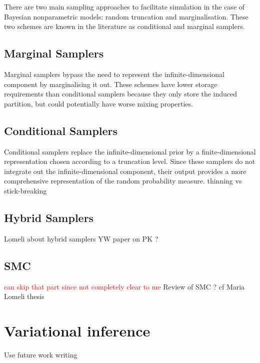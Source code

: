 There are two main sampling approaches to facilitate simulation in the case of Bayesian nonparametric models: random truncation and marginalisation. These two schemes are known in the literature as conditional and marginal samplers.

\subsection{Marginal Samplers}
Marginal samplers bypass the need to represent the infinite-dimensional component by marginalising it out. These schemes have lower storage requirements than conditional samplers because they only store the induced partition, but could potentially have worse mixing properties.

\subsection{Conditional Samplers}
Conditional samplers replace the infinite-dimensional prior by a finite-dimensional representation chosen according to a truncation level. Since these samplers do not integrate out the infinite-dimensional component, their output provides a more comprehensive representation of the random probability measure.
thinning vs stick-breaking

\subsection{Hybrid Samplers}
Lomeli about hybrid samplers
YW paper on PK ?

\subsection{SMC}
\textcolor{red}{can skip that part since not completely clear to me}
Review of SMC ?
cf Maria Lomeli thesis


\section{Variational inference}
Use future work writing
